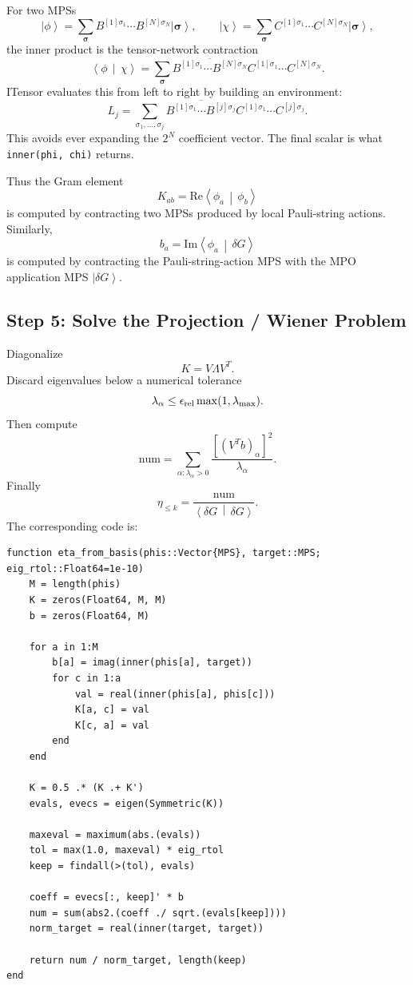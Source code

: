 \documentclass[11pt]{article}
\newcommand{\ket}[1]{\left|#1\right\rangle}
\newcommand{\braket}[2]{\left\langle#1\,\middle|\,#2\right\rangle}
\newcommand{\dd}{\delta}
\begin{document}
For two MPSs
\[
  \ket{\phi}
  =
  \sum_{\bm\sigma}
  B^{[1]\sigma_1}\cdots B^{[N]\sigma_N}
  \ket{\bm\sigma},
  \qquad
  \ket{\chi}
  =
  \sum_{\bm\sigma}
  C^{[1]\sigma_1}\cdots C^{[N]\sigma_N}
  \ket{\bm\sigma},
\]
the inner product is the tensor-network contraction
\begin{equation}
  \braket{\phi}{\chi}
  =
  \sum_{\bm\sigma}
  \overline{
    B^{[1]\sigma_1}
    \cdots
    B^{[N]\sigma_N}
  }
  C^{[1]\sigma_1}
  \cdots
  C^{[N]\sigma_N}.
\end{equation}
ITensor evaluates this from left to right by building an environment:
\begin{equation}
  L_j
  =
  \sum_{\sigma_1,\ldots,\sigma_j}
  \overline{
    B^{[1]\sigma_1}\cdots B^{[j]\sigma_j}
  }
  C^{[1]\sigma_1}\cdots C^{[j]\sigma_j}.
\end{equation}
This avoids ever expanding the $2^N$ coefficient vector.  The final
scalar is what \texttt{inner(phi, chi)} returns.

Thus the Gram element
\[
  K_{ab}=\mathrm{Re}\braket{\phi_a}{\phi_b}
\]
is computed by contracting two MPSs produced by local Pauli-string
actions.  Similarly,
\[
  b_a=\mathrm{Im}\braket{\phi_a}{\dd G}
\]
is computed by contracting the Pauli-string-action MPS with the MPO
application MPS $\ket{\dd G}$.

\subsection{Step 5: Solve the Projection / Wiener Problem}

Diagonalize
\[
  K=V\Lambda V^T.
\]
Discard eigenvalues below a numerical tolerance
\[
  \lambda_\alpha
  \le
  \epsilon_{\rm rel}\max(1,\lambda_{\rm max}).
\]
Then compute
\begin{equation}
  \mathrm{num}
  =
  \sum_{\alpha:\lambda_\alpha>0}
  \frac{
    \left[(V^Tb)_\alpha\right]^2
  }{
    \lambda_\alpha
  }.
\end{equation}
Finally
\begin{equation}
  \boxed{
  \eta_{\le k}
  =
  \frac{\mathrm{num}}{\braket{\dd G}{\dd G}}.
  }
\end{equation}
The corresponding code is:
\begin{lstlisting}
function eta_from_basis(phis::Vector{MPS}, target::MPS; eig_rtol::Float64=1e-10)
    M = length(phis)
    K = zeros(Float64, M, M)
    b = zeros(Float64, M)

    for a in 1:M
        b[a] = imag(inner(phis[a], target))
        for c in 1:a
            val = real(inner(phis[a], phis[c]))
            K[a, c] = val
            K[c, a] = val
        end
    end

    K = 0.5 .* (K .+ K')
    evals, evecs = eigen(Symmetric(K))

    maxeval = maximum(abs.(evals))
    tol = max(1.0, maxeval) * eig_rtol
    keep = findall(>(tol), evals)

    coeff = evecs[:, keep]' * b
    num = sum(abs2.(coeff ./ sqrt.(evals[keep])))
    norm_target = real(inner(target, target))

    return num / norm_target, length(keep)
end
\end{lstlisting}
\end{document}
